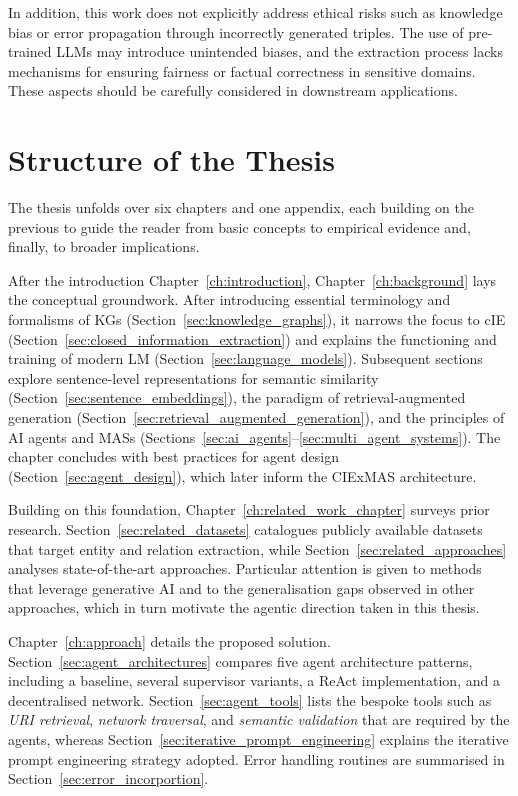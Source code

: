 \documentclass[a4paper,oneside,bibliography=totoc]{scrbook}
\begin{document}
In addition, this work does not explicitly address ethical risks such as knowledge bias or error propagation through incorrectly generated triples. The use of pre-trained \acp{LLM} may introduce unintended biases, and the extraction process lacks mechanisms for ensuring fairness or factual correctness in sensitive domains. These aspects should be carefully considered in downstream applications.

\section{Structure of the Thesis}
\label{sec:structure}

The thesis unfolds over six chapters and one appendix, each building on the previous to guide the reader from basic concepts to empirical evidence and, finally, to broader implications.

After the introduction Chapter~\ref{ch:introduction}, Chapter~\ref{ch:background} lays the conceptual groundwork. After introducing essential terminology and formalisms of \acp{KG} (Section~\ref{sec:knowledge_graphs}), it narrows the focus to \ac{cIE} (Section~\ref{sec:closed_information_extraction}) and explains the functioning and training of modern \ac{LM} (Section~\ref{sec:language_models}). Subsequent sections explore sentence-level representations for semantic similarity (Section~\ref{sec:sentence_embeddings}), the paradigm of retrieval-augmented generation (Section~\ref{sec:retrieval_augmented_generation}), and the principles of AI agents and \acp{MAS} (Sections~\ref{sec:ai_agents}–\ref{sec:multi_agent_systems}). The chapter concludes with best practices for agent design (Section~\ref{sec:agent_design}), which later inform the CIExMAS architecture.

Building on this foundation, Chapter~\ref{ch:related_work_chapter} surveys prior research. Section~\ref{sec:related_datasets} catalogues publicly available datasets that target entity and relation extraction, while Section~\ref{sec:related_approaches} analyses state-of-the-art approaches. Particular attention is given to methods that leverage generative AI and to the generalisation gaps observed in other approaches, which in turn motivate the agentic direction taken in this thesis.

Chapter~\ref{ch:approach} details the proposed solution. Section~\ref{sec:agent_architectures} compares five agent architecture patterns, including a baseline, several supervisor variants, a \ac{ReAct} implementation, and a decentralised network. Section~\ref{sec:agent_tools} lists the bespoke tools such as \textit{\ac{URI} retrieval}, \textit{network traversal}, and \textit{semantic validation} that are required by the agents, whereas Section~\ref{sec:iterative_prompt_engineering} explains the iterative prompt engineering strategy adopted. Error handling routines are summarised in Section~\ref{sec:error_incorportion}.
\end{document}
